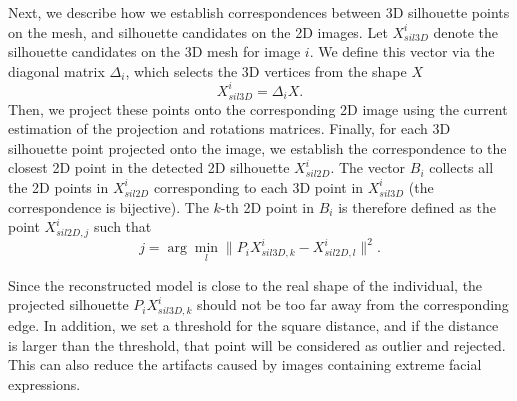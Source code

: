 Next, we describe how we establish correspondences between 3D silhouette points on the mesh, and silhouette candidates on the 2D images. Let $X_{sil3D}^i$ denote the silhouette candidates on the 3D mesh for image $i$. 
We define this vector via the diagonal matrix $\Delta_i$, which selects the 3D vertices from the shape $X$ 
\begin{equation}
X_{sil3D}^i  = \Delta_i X.
\end{equation}
Then, we project these points onto the corresponding 2D image using the current estimation of the projection and rotations matrices. Finally, for each 3D silhouette point projected onto the image, we establish the correspondence to the closest 2D point in the detected 2D silhouette $X_{sil2D}^{i}$.
The vector $B_i$ collects all the 2D points in $X_{sil2D}^{i}$ corresponding to each 3D point in $X_{sil3D}^i $ (the correspondence is bijective). The $k$-th 2D point in $B_i$ is therefore defined as the point $X_{sil2D,j}^{i}$ such that 
\begin{equation}
j = \arg{\min}_{l} \|P_{i} X_{sil3D,k}^{i} - X_{sil2D,l}^{i}\|^2.
\end{equation} 

Since the reconstructed model is close to the real shape of the individual, the projected silhouette $P_i X_{sil3D,k}^{i}$ should not be too far away from the corresponding edge. In addition, we set a threshold for the square distance, and if the distance is larger than the threshold, that point will be considered as outlier and rejected. This can also reduce the artifacts caused by images containing extreme facial expressions.



